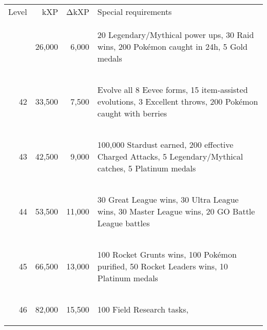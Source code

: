 \begin{table}[ht]
\begin{center}
\begin{tabular}{r r r l}
Level & kXP & ΔkXP & Special requirements \\
\Midrule
41 & 26,000 & 6,000 & \begin{varwidth}{\dimexpr0.5\linewidth}
                      20 Legendary/Mythical power ups,
                      30 Raid wins,
                      200 Pokémon caught in 24h,
                      5 Gold medals
                      \end{varwidth} \\
                      \hline
42 & 33,500 & 7,500 & \begin{varwidth}{\dimexpr0.5\linewidth}
                      Evolve all 8 Eevee forms,
                      15 item-assisted evolutions,
                      3 Excellent throws,
                      200 Pokémon caught with berries
                      \end{varwidth} \\
                      \hline
43 & 42,500 & 9,000 & \begin{varwidth}{\dimexpr0.5\linewidth}
                      100,000 Stardust earned,
                      200 effective Charged Attacks,
                      5 Legendary/Mythical catches,
                      5 Platinum medals
                      \end{varwidth} \\
                      \hline
44 & 53,500 & 11,000 & \begin{varwidth}{\dimexpr0.5\linewidth}
                       30 Great League wins,
                       30 Ultra League wins,
                       30 Master League wins,
                       20 GO Battle League battles
                       \end{varwidth} \\
                       \hline
45 & 66,500 & 13,000 & \begin{varwidth}{\dimexpr0.5\linewidth}
                       100 Rocket Grunts wins,
                       100 Pokémon purified,
                       50 Rocket Leaders wins,
                       10 Platinum medals
                       \end{varwidth} \\
                       \hline
46 & 82,000 & 15,500 & \begin{varwidth}{\dimexpr0.5\linewidth}
                       100 Field Research tasks,

\end{varwidth}
\end{tabular}
\end{center}
\end{table}
